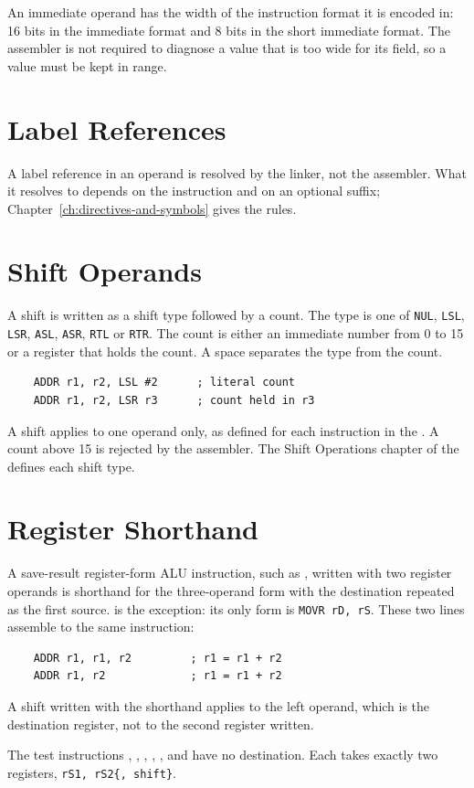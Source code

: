 An immediate operand has the width of the instruction format it is encoded in: 16 bits in the immediate format and 8
bits in the short immediate format. The assembler is not required to diagnose a value that is too wide for its field,
so a value must be kept in range.

\section{Label References}

A label reference in an operand is resolved by the linker, not the assembler. What it resolves to depends on the
instruction and on an optional suffix; Chapter~\ref{ch:directives-and-symbols} gives the rules.

\section{Shift Operands}

A shift is written as a shift type followed by a count. The type is one of \texttt{NUL}, \texttt{LSL}, \texttt{LSR},
\texttt{ASL}, \texttt{ASR}, \texttt{RTL} or \texttt{RTR}. The count is either an immediate number from 0 to 15 or a
register that holds the count. A space separates the type from the count.

\begin{lstlisting}
    ADDR r1, r2, LSL #2      ; literal count
    ADDR r1, r2, LSR r3      ; count held in r3
\end{lstlisting}

A shift applies to one operand only, as defined for each instruction in the \archmanual{}. A count above 15 is rejected
by the assembler. The Shift Operations chapter of the \archmanual{} defines each shift type.

\section{Register Shorthand}

A save-result register-form ALU instruction, such as , written with two register operands is shorthand
for the three-operand form with the destination repeated as the first source.  is the exception: its
only form is \texttt{MOVR rD, rS}. These two lines assemble to the same instruction:

\begin{lstlisting}
    ADDR r1, r1, r2         ; r1 = r1 + r2
    ADDR r1, r2             ; r1 = r1 + r2
\end{lstlisting}

A shift written with the shorthand applies to the left operand, which is the destination register, not to the second
register written.

The test instructions , , , , ,
 and  have no destination. Each takes exactly two registers, \texttt{rS1, rS2\{,
	shift\}}.
